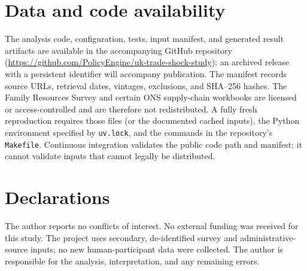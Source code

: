 \section*{Data and code availability}

The analysis code, configuration, tests, input manifest, and generated result
artifacts are available in the accompanying GitHub repository
(\url{https://github.com/PolicyEngine/uk-trade-shock-study}); an archived
release with a persistent identifier will accompany publication. The manifest
records source URLs, retrieval dates, vintages, exclusions, and SHA--256
hashes. The Family Resources Survey and certain ONS supply-chain workbooks are
licensed or access-controlled and are therefore not redistributed. A fully
fresh reproduction requires those files (or the documented cached inputs),
the Python environment specified by \texttt{uv.lock}, and the commands in the
repository's \texttt{Makefile}. Continuous integration validates the public
code path and manifest; it cannot validate inputs that cannot legally be
distributed.

\section*{Declarations}

The author reports no conflicts of interest. No external funding was received
for this study. The project uses secondary, de-identified survey and
administrative-source inputs; no new human-participant data were collected.
The author is responsible for the analysis, interpretation, and any remaining
errors.
